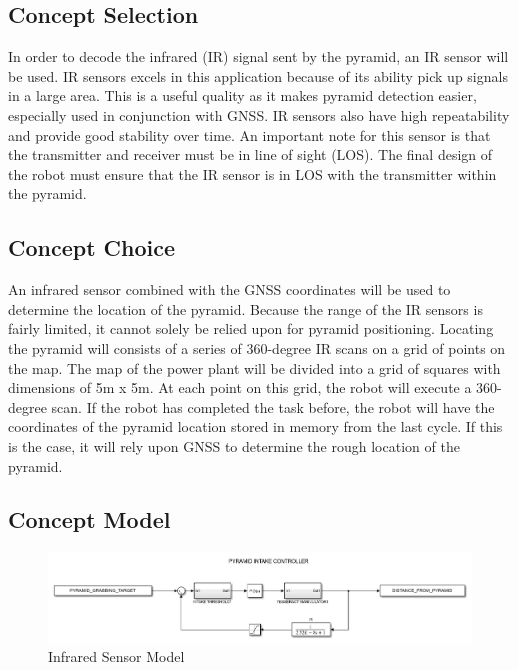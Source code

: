 \documentclass[12pt]{article}
\begin{document}
\subsection{Concept Selection}
In order to decode the infrared (IR) signal sent by the pyramid, an IR sensor will be used.  IR sensors excels in this application because of its ability pick up signals in a large area. This is a useful quality as it makes pyramid detection easier, especially used in conjunction with  GNSS. IR sensors also have high repeatability and provide good stability over time. An important note for this sensor is that the transmitter and receiver must be in line of sight (LOS). The final design of the robot must ensure that the IR sensor is in LOS with the transmitter within the pyramid. 

\subsection{Concept Choice}
An infrared sensor combined with the GNSS coordinates will be used to determine the location of the pyramid. Because the range of the IR sensors is fairly limited, it cannot solely be relied upon for pyramid positioning. Locating the pyramid will consists of a series of 360-degree IR scans on a grid of points on the map. The map of the power plant will be divided into a grid of squares with dimensions of 5m x 5m. At each point on this grid, the robot will execute a 360-degree scan. If the robot has completed the task before, the robot will have the coordinates of the pyramid location stored in memory from the last cycle. If this is the case, it will rely upon GNSS to determine the rough location of the pyramid. 


\subsection{Concept Model}
\begin{figure}[htb!]
\begin{center}
\caption{Infrared Sensor Model}
\includegraphics[scale=0.6]{Figures/simulink_pyramid}
\end{center}
\end{figure}
\FloatBarrier
\end{document}
